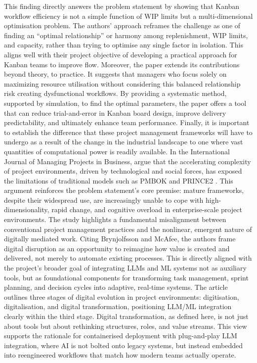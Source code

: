 \documentclass{report}
\begin{document}
This finding directly answers the problem statement by showing that Kanban workflow efficiency is not a simple function of WIP limits but a multi-dimensional optimisation problem. The authors’ approach reframes the challenge as one of finding an “optimal relationship” or harmony among replenishment, WIP limits, and capacity, rather than trying to optimise any single factor in isolation. This aligns well with their project objective of developing a practical approach for Kanban teams to improve flow.
Moreover, the paper extends its contributions beyond theory, to practice. It suggests that managers who focus solely on maximizing resource utilisation without considering this balanced relationship risk creating dysfunctional workflows. By providing a systematic method, supported by simulation, to find the optimal parameters, the paper offers a tool that can reduce trial-and-error in Kanban board design, improve delivery predictability, and ultimately enhance team performance.
Finally, it is important to establish the difference that these project management frameworks will have to undergo as a result of the change in the industrial landscape to one where vast quantities of computational power is readily available. In the International Journal of Managing Projects in Business, \citeauthor{sonta-draczkowskaChallengesScalingAgile2024} argue that the accelerating complexity of project environments, driven by technological and social forces, has exposed the limitations of traditional models such as PMBOK and PRINCE2 \parencite{sonta-draczkowskaChallengesScalingAgile2024}. This argument reinforces the problem statement’s core premise: mature frameworks, despite their widespread use, are increasingly unable to cope with high-dimensionality, rapid change, and cognitive overload in enterprise-scale project environments.
The study highlights a fundamental misalignment between conventional project management practices and the nonlinear, emergent nature of digitally mediated work. Citing Brynjolfsson and McAfee, the authors frame digital disruption as an opportunity to reimagine how value is created and delivered, not merely to automate existing processes. This is directly aligned with the project’s broader goal of integrating LLMs and ML systems not as auxiliary tools, but as foundational components for transforming task management, sprint planning, and decision cycles into adaptive, real-time systems.
The article outlines three stages of digital evolution in project environments: digitisation, digitalisation, and digital transformation, positioning LLM/ML integration clearly within the third stage. Digital transformation, as defined here, is not just about tools but about rethinking structures, roles, and value streams. This view supports the rationale for containerised deployment with plug-and-play LLM integration, where AI is not bolted onto legacy systems, but instead embedded into reengineered workflows that match how modern teams actually operate.
\end{document}
